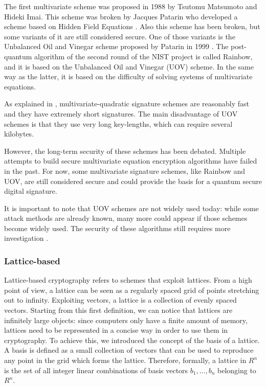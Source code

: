 \documentclass[a4paper,12pt]{article}
\begin{document}
The first multivariate scheme was proposed in 1988 by Tsutomu Matsumoto and Hideki Imai. This scheme was broken by Jacques Patarin who developed a scheme based on Hidden Field Equations \cite{22_HFE}. Also this scheme has been broken, but some variants of it are still considered secure. One of those variants is the Unbalanced Oil and Vinegar scheme proposed by Patarin in 1999 \cite{23_unbalancedvinegar}.
The post-quantum algorithm of the second round of the NIST project is called Rainbow, and it is based on the Unbalanced Oil and Vinegar (UOV) scheme. In the same way as the latter, it is based on the difficulty of solving systems of multivariate equations.

As explained in \cite{1_sphincspaper}, multivariate-quadratic signature schemes are reasonably fast and they have extremely short signatures.
The main disadvantage of UOV schemes is that they use very long key-lengths, which can require several kilobytes. 

However, the long-term security of these schemes has been debated. Multiple attempts to build secure multivariate equation encryption algorithms have failed in the past.
For now, some multivariate signature schemes, like Rainbow and UOV, are still considered secure and could provide the basis for a quantum secure digital signature.

It is important to note that UOV schemes are not widely used today: while some attack methods are already known, many more could appear if those schemes become widely used. The security of these algorithms still requires more investigation \cite{23_unbalancedvinegar}.


\subsubsection{Lattice-based}

Lattice-based cryptography refers to schemes that exploit lattices.
From a high point of view, a lattice can be seen as a regularly spaced grid of points stretching out to infinity. Exploiting vectors, a lattice is a collection of evenly spaced vectors.
Starting from this first definition, we can notice that lattices are infinitely large objects: since computers only have a finite amount of memory, lattices need to be represented in a concise way in order to use them in cryptography. To achieve this, we introduced the concept of the basis of a lattice. A basis is defined as a small collection of vectors that can be used to reproduce any point in the grid which forms the lattice.
Therefore, formally, a lattice in $R^{n}$ is the set of all integer linear combinations of basis vectors $b_{1}, ... , b_{n}$ belonging to $R^{n}$.
\end{document}
